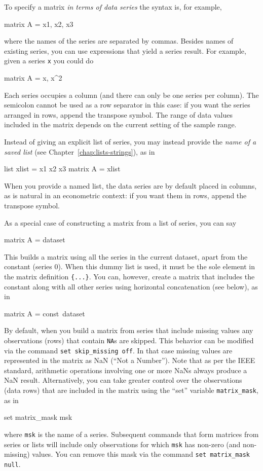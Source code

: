 To specify a matrix \textit{in terms of data series} the syntax is,
for example,
%
\begin{code}
matrix A = {x1, x2, x3}
\end{code}
%
where the names of the series are separated by commas.  Besides names
of existing series, you can use expressions that yield a series
result.  For example, given a series \texttt{x} you could do
%
\begin{code}
matrix A = {x, x^2}
\end{code}
%
Each series occupies a column (and there can only be one series per
column).  The semicolon cannot be used as a row separator in this
case: if you want the series arranged in rows, append the transpose
symbol.  The range of data values included in the matrix depends on
the current setting of the sample range.

Instead of giving an explicit list of series, you may instead provide
the \textit{name of a saved list} (see
Chapter~\ref{chap:lists-strings}), as in
%
\begin{code}
list xlist = x1 x2 x3
matrix A = {xlist}
\end{code}
%
When you provide a named list, the data series are by default placed
in columns, as is natural in an econometric context: if you want them
in rows, append the transpose symbol.

As a special case of constructing a matrix from a list of series,
you can say
%
\begin{code}
matrix A = {dataset}
\end{code}
%
This builds a matrix using all the series in the current dataset,
apart from the constant (series 0).  When this dummy list is used, it
must be the sole element in the matrix definition \texttt{\{...\}}.  You
can, however, create a matrix that includes the constant along with
all other series using horizontal concatenation (see below), as in
%
\begin{code}
matrix A = {const}~{dataset}
\end{code}
%

By default, when you build a matrix from series that include missing
values any observations (rows) that contain \texttt{NA}s are skipped.
This behavior can be modified via the command \texttt{set
  skip\_missing off}.  In that case missing values are represented in
the matrix as NaN (``Not a Number'').  Note that as per the IEEE
standard, arithmetic operations involving one or more NaNs always
produce a NaN result. Alternatively, you can take greater control over
the observations (data rows) that are included in the matrix using the
``set'' variable \texttt{matrix\_mask}, as in
%
\begin{code}
set matrix_mask msk
\end{code}
%
where \texttt{msk} is the name of a series.  Subsequent commands that
form matrices from series or lists will include only observations
for which \texttt{msk} has non-zero (and non-missing) values. You
can remove this mask via the command \texttt{set matrix\_mask null}.

